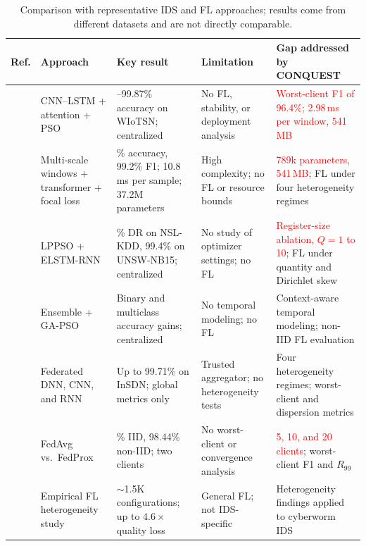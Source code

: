 \documentclass[conference]{IEEEtran}
\begin{document}
\begin{table}[!t]
\centering
\scriptsize
\caption{Comparison with representative IDS and FL approaches; results come from different datasets and are not directly comparable.}
\label{tab:comparative_analysis}
\def\rc#1{\textcolor{red}{#1}}
\setlength{\tabcolsep}{5pt}
\renewcommand{\arraystretch}{1.3}
\begin{tabular}{>{\raggedright\arraybackslash}p{1.0cm} >{\raggedright\arraybackslash}p{2.6cm} >{\raggedright\arraybackslash}p{4.0cm} >{\raggedright\arraybackslash}p{3.2cm} >{\raggedright\arraybackslash}p{4.4cm}}
\hline\toprule
\textbf{Ref.} & \textbf{Approach} & \textbf{Key result} & \textbf{Limitation} & \textbf{Gap addressed by CONQUEST} \\
\hline\toprule
\cite{phalaagaehybrid} & CNN--LSTM + attention + PSO & 98.73--99.87\% accuracy on WIoTSN; centralized & No FL, stability, or deployment analysis & \rc{Worst-client F1 of 96.4\%; 2.98\,ms per window, 541\,MB} \\
\midrule
\cite{yuadaptive} & Multi-scale windows + transformer + focal loss & 99.6\% accuracy, 99.2\% F1; 10.8\,ms per sample; 37.2M parameters & High complexity; no FL or resource bounds & \rc{789k parameters, 541\,MB}; FL under four heterogeneity regimes \\
\midrule
\cite{donkoloptimization} & LPPSO + ELSTM-RNN & 99.95\% DR on NSL-KDD, 99.4\% on UNSW-NB15; centralized & No study of optimizer settings; no FL & \rc{Register-size ablation, $Q=1$ to 10}; FL under quantity and Dirichlet skew \\
\midrule
\cite{shrivashybrid} & Ensemble + GA-PSO & Binary and multiclass accuracy gains; centralized & No temporal modeling; no FL & Context-aware temporal modeling; non-IID FL evaluation \\
\midrule
\cite{FRIHA202217} & Federated DNN, CNN, and RNN & Up to 99.71\% on InSDN; global metrics only & Trusted aggregator; no heterogeneity tests & Four heterogeneity regimes; worst-client and dispersion metrics \\
\midrule
\cite{herlambangfederated} & FedAvg vs.\ FedProx & 98.75\% IID, 98.44\% non-IID; two clients & No worst-client or convergence analysis & \rc{5, 10, and 20 clients}; worst-client F1 and $R_{99}$ \\
\midrule
\cite{abdelmoniemcomprehensive} & Empirical FL heterogeneity study & ${\sim}$1.5K configurations; up to $4.6\times$ quality loss & General FL; not IDS-specific & Heterogeneity findings applied to cyberworm IDS \\

\end{tabular}
\end{table}
\end{document}
